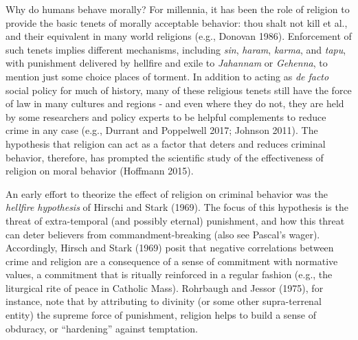 \documentclass[smallextended]{svjour3}       %
\begin{document}
Why do humans behave morally? For millennia, it has been the role of
religion to provide the basic tenets of morally acceptable behavior:
thou shalt not kill et al., and their equivalent in many world religions
(e.g., Donovan 1986). Enforcement of such tenets implies different
mechanisms, including \emph{sin}, \emph{haram}, \emph{karma}, and
\emph{tapu}, with punishment delivered by hellfire and exile to
\emph{Jahannam} or \emph{Gehenna}, to mention just some choice places of
torment. In addition to acting as \emph{de facto} social policy for much
of history, many of these religious tenets still have the force of law
in many cultures and regions - and even where they do not, they are held
by some researchers and policy experts to be helpful complements to
reduce crime in any case (e.g., Durrant and Poppelwell 2017; Johnson
2011). The hypothesis that religion can act as a factor that deters and
reduces criminal behavior, therefore, has prompted the scientific study
of the effectiveness of religion on moral behavior (Hoffmann 2015).

An early effort to theorize the effect of religion on criminal behavior
was the \emph{hellfire hypothesis} of Hirschi and Stark (1969). The
focus of this hypothesis is the threat of extra-temporal (and possibly
eternal) punishment, and how this threat can deter believers from
commandment-breaking (also see Pascal's wager). Accordingly, Hirsch and
Stark (1969) posit that negative correlations between crime and religion
are a consequence of a sense of commitment with normative values, a
commitment that is ritually reinforced in a regular fashion (e.g., the
liturgical rite of peace in Catholic Mass). Rohrbaugh and Jessor (1975),
for instance, note that by attributing to divinity (or some other
supra-terrenal entity) the supreme force of punishment, religion helps
to build a sense of obduracy, or ``hardening'' against temptation.
\end{document}
